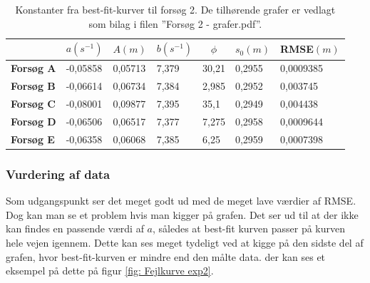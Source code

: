 \begin{table}[h]
\centering
\begin{tabular}{|l|l|l|l|l|l|l|}
\hline
\multicolumn{1}{|c|}{} & \multicolumn{1}{c|}{\textbf{$a(s^{-1})$}} & \multicolumn{1}{c|}{\textbf{$A(m)$}} & \multicolumn{1}{c|}{\textbf{$b(s^{-1})$}} & \multicolumn{1}{c|}{\textbf{$\phi$}} & \multicolumn{1}{c|}{\textbf{$s_0(m)$}} & \multicolumn{1}{c|}{\textbf{RMSE$(m)$}} \\ \hline
\textbf{Forsøg A}      & -0,05858                          & 0,05713                           & 7,379                             & 30,21                                & 0,2955                              & 0,0009385                          \\ \hline
\textbf{Forsøg B}      & -0,06614                          & 0,06734                           & 7,384                             & 2,985                                & 0,2952                              & 0,003745                           \\ \hline
\textbf{Forsøg C}      & -0,08001                          & 0,09877                           & 7,395                             & 35,1                                 & 0,2949                              & 0,004438                           \\ \hline
\textbf{Forsøg D}      & -0,06506                          & 0,06517                           & 7,377                             & 7,275                                & 0,2958                              & 0,0009644                          \\ \hline
\textbf{Forsøg E}      & -0,06358                          & 0,06068                           & 7,385                             & 6,25                                 & 0,2959                              & 0,0007398                          \\ \hline
\end{tabular}
\caption{Konstanter fra best-fit-kurver til forsøg 2. De tilhørende grafer er vedlagt som bilag i filen ''Forsøg 2 - grafer.pdf''.}
\end{table}

\subsubsection{Vurdering af data}

Som udgangspunkt ser det meget godt ud med de meget lave værdier af RMSE. 
Dog kan man se et problem hvis man kigger på grafen.
Det ser ud til at der ikke kan findes en passende værdi af $a$, således at best-fit kurven passer på kurven hele vejen igennem. 
Dette kan ses meget tydeligt ved at kigge på den sidste del af grafen, hvor best-fit-kurven er mindre end den målte data.
der kan ses et eksempel på dette på figur \ref{fig: Fejlkurve exp2}.

